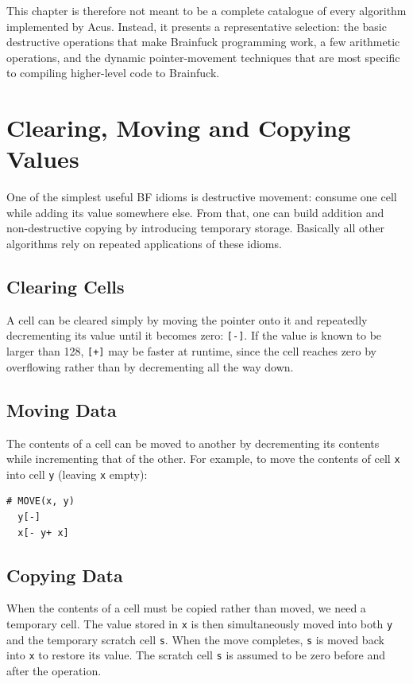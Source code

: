 This chapter is therefore not meant to be a complete catalogue of every algorithm implemented by Acus. Instead, it presents a representative selection: the basic destructive operations that make Brainfuck programming work, a few arithmetic operations, and the dynamic pointer-movement techniques that are most specific to compiling higher-level code to Brainfuck. 

\section{Clearing, Moving and Copying Values}
\label{sec:compilation:movecopy}
One of the simplest useful BF idioms is destructive movement: consume one cell while adding its value somewhere else. From that, one can build addition and non-destructive copying by introducing temporary storage. Basically all other algorithms rely on repeated applications of these idioms.

\subsection{Clearing Cells}
A cell can be cleared simply by moving the pointer onto it and repeatedly decrementing its value until it becomes zero: \texttt{[-]}. If the value is known to be larger than 128, \texttt{[+]} may be faster at runtime, since the cell reaches zero by overflowing rather than by decrementing all the way down.

\subsection{Moving Data}
The contents of a cell can be moved to another by decrementing its contents while incrementing that of the other. For example, to move the contents of cell \texttt{x} into cell \texttt{y} (leaving \texttt{x} empty):

\vspace{0.5cm}\noindent\begin{minipage}{\textwidth}
\begin{lstlisting}[style=brainfuck]
  # MOVE(x, y)
  y[-]
  x[- y+ x]
\end{lstlisting}
\end{minipage}

\subsection{Copying Data}
When the contents of a cell must be copied rather than moved, we need a temporary cell. The value stored in \texttt{x} is then simultaneously moved into both \texttt{y} and the temporary scratch cell \texttt{s}. When the move completes, \texttt{s} is moved back into \texttt{x} to restore its value. The scratch cell \texttt{s} is assumed to be zero before and after the operation.

